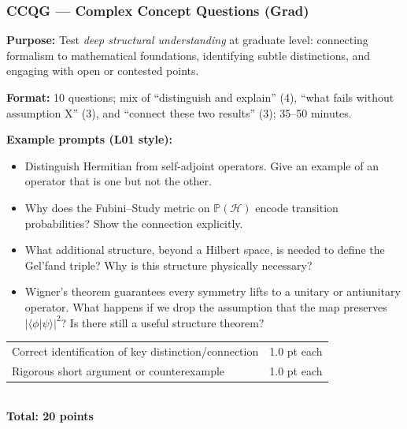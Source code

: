\documentclass[11pt,a4paper]{article}
\begin{document}
\subsubsection{CCQG --- Complex Concept Questions (Grad)}

\begin{tcolorbox}[gradconceptbox, title={CCQG --- Complex Concept Questions, Graduate \hfill\normalfont 10 questions}]

\textbf{Purpose:} Test \emph{deep structural understanding} at graduate level: connecting
formalism to mathematical foundations, identifying subtle distinctions, and engaging with
open or contested points.

\medskip\textbf{Format:} 10 questions; mix of ``distinguish and explain'' (4),
``what fails without assumption X'' (3), and ``connect these two results'' (3);
35--50 minutes.

\medskip\textbf{Example prompts (L01 style):}
\begin{itemize}[leftmargin=1.5em,itemsep=2pt]
  \item Distinguish Hermitian from self-adjoint operators. Give an example of an operator
        that is one but not the other.
  \item Why does the Fubini--Study metric on $\mathbb{P}(\mathcal{H})$ encode transition
        probabilities? Show the connection explicitly.
  \item What additional structure, beyond a Hilbert space, is needed to define the
        Gel'fand triple? Why is this structure physically necessary?
  \item Wigner's theorem guarantees every symmetry lifts to a unitary or antiunitary
        operator. What happens if we drop the assumption that the map preserves
        $|\langle\phi|\psi\rangle|^2$? Is there still a useful structure theorem?
\end{itemize}
\end{tcolorbox}

\begin{tcolorbox}[rubricbox, title={CCQG Rubric}]
\begin{tabular}{ll}
  Correct identification of key distinction/connection & 1.0 pt each\\
  Rigorous short argument or counterexample            & 1.0 pt each\\
\end{tabular}\\[4pt]
\textbf{Total: 20 points}
\end{tcolorbox}
\end{document}
